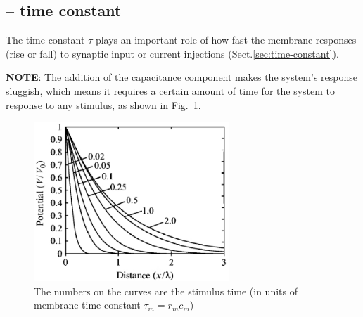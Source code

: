 \subsection{-- time constant}
\label{sec:membrane-time-constant}

%   

The time constant $\tau$ plays an important role of how fast the membrane
responses (rise or fall) to synaptic input or current injections
(Sect.\ref{sec:time-constant}).


{\bf NOTE}: The addition of the capacitance component makes the system's response
sluggish, which means it requires a certain amount of time for the system
to response to any stimulus, as shown in Fig.~\ref{fig:V_standardized-x}. 

\begin{figure}[htb]
\centerline{\includegraphics[height=6cm]{./images/V_standardized-x.eps}}
\caption{The numbers on the curves are the stimulus time (in units of
  membrane time-constant $\tau_m = r_m c_m$)}\label{fig:V_standardized-x}
\end{figure}

